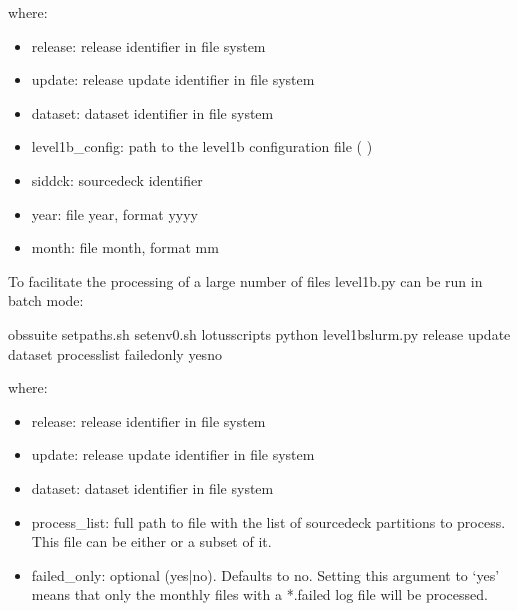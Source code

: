 \documentclass[letterpaper,10pt,english]{sphinxmanual}
\begin{document}
where:
\begin{itemize}
\item {} 
release: release identifier in file system

\item {} 
update: release update identifier in file system

\item {} 
dataset: dataset identifier in file system

\item {} 
level1b\_config: path to the level1b configuration file ( {\hyperref[\detokenize{index:level1b-config-file}]{}})

\item {} 
sid\sphinxhyphen{}dck: source\sphinxhyphen{}deck identifier

\item {} 
year: file year, format yyyy

\item {} 
month: file month, format mm

\end{itemize}

To facilitate the processing of a large number of files level1b.py can be run
in batch mode:

\begin{sphinxVerbatim}[commandchars=\\\{\}]
 obs\PYGZhy{}suite
 setpaths.sh
 setenv0.sh
 lotus\PYGZus{}scripts
python level1b\PYGZus{}slurm.py release update dataset  process\PYGZus{}list \PYGZhy{}\PYGZhy{}failed\PYGZus{}only yesno
\end{sphinxVerbatim}

where:
\begin{itemize}
\item {} 
release: release identifier in file system

\item {} 
update: release update identifier in file system

\item {} 
dataset: dataset identifier in file system

\item {} 
process\_list: full path to file with the list of source\sphinxhyphen{}deck partitions to
process. This file can be either {\hyperref[\detokenize{index:process-list-file}]{}} or a subset of it.

\item {} 
failed\_only: optional (yes|no). Defaults to no. Setting this argument to ‘yes’
means that only the monthly files with a *.failed log file will be processed.

\end{itemize}
\end{document}
